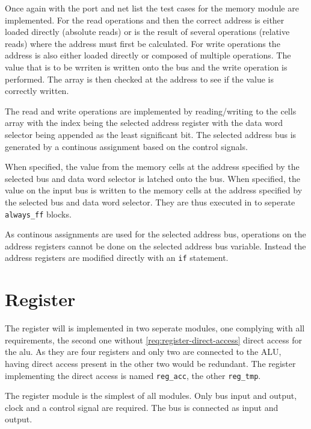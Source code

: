Once again with the port and net list the test cases for the memory module are implemented. For the read operations and then the correct address is either loaded directly (absolute reads) or is the result of several operations (relative reads) where the address must first be calculated. For write operations the address is also either loaded directly or composed of multiple operations. The value that is to be wrriten is written onto the bus and the write operation is performed. The array is then checked at the address to see if the value is correctly written.

The read and write operations are implemented by reading/writing to the cells array with the index being the selected address register with the data word selector being appended as the least significant bit. The selected address bus is generated by a continous assignment based on the control signals. 

When specified, the value from the memory cells at the address specified by the selected bus and data word selector is latched onto the bus. When specified, the value on the input bus is written to the memory cells at the address specified by the selected bus and data word selector. They are thus executed in to seperate \texttt{always\_ff} blocks.

As continous assignments are used for the selected address bus, operations on the address registers cannot be done on the selected address bus variable. Instead the address registers are modified directly with an \texttt{if} statement.


\section{Register}
The register will is implemented in two seperate modules, one complying with all requirements, the second one without \ref{req:register-direct-access} direct access for the alu. As they are four registers and only two are connected to the ALU, having direct access present in the other two would be redundant. The register implementing the direct access is named \texttt{reg\_acc}, the other \texttt{reg\_tmp}.

The register module is the simplest of all modules. Only bus input and output, clock and a control signal are required. The bus is connected as input and output.

